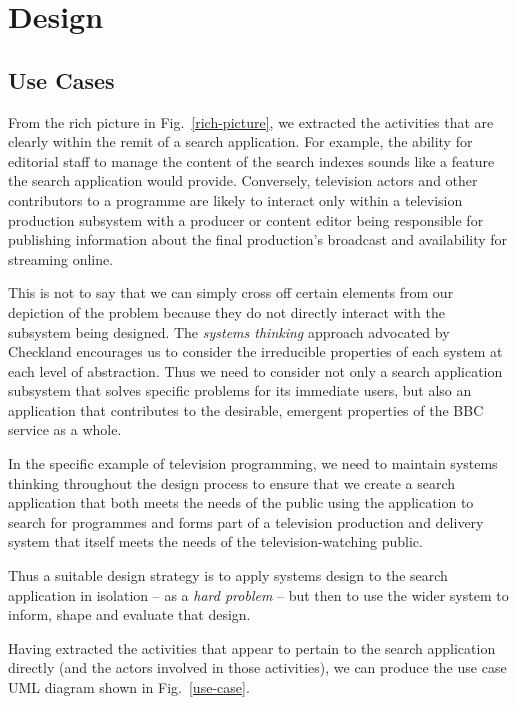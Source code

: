 \documentclass{llncs}
\begin{document}
\section{Design}
\label{design}

\subsection{Use Cases}

From the rich picture in Fig.~\ref{rich-picture}, we
extracted the activities that are clearly within the remit of a search
application. For example, the ability for editorial staff to manage
the content of the search indexes sounds like a feature the search
application would provide. Conversely, television actors and other
contributors to a programme are likely to interact only within a television
production subsystem with a producer or content editor being responsible
for publishing information about the final production's broadcast and
availability for streaming online.

This is not to say that we can simply cross off certain elements from
our depiction of the problem because they do not directly interact
with the subsystem being designed. The \emph{systems thinking} approach
advocated by Checkland\cite{checkland1999systems} encourages us to
consider the irreducible properties of each system at each level
of abstraction. Thus we need to consider not only a search application
subsystem that solves specific problems for its immediate users, but
also an application that contributes to the desirable, emergent
properties of the BBC service as a whole.

In the specific example of television programming, we need to maintain
systems thinking throughout the design process to ensure that we
create a search application that both meets the needs of the public
using the application to search for programmes and forms part of
a television production and delivery system that itself meets the
needs of the television-watching public.

Thus a suitable design strategy is to apply systems design to
the search application in isolation -- as a \emph{hard problem} --
but then to use the wider system to inform, shape and evaluate that design.

Having extracted the activities that appear to pertain to the
search application directly (and the actors involved in those activities),
we can produce the use case UML diagram shown in Fig.~\ref{use-case}.
\end{document}
